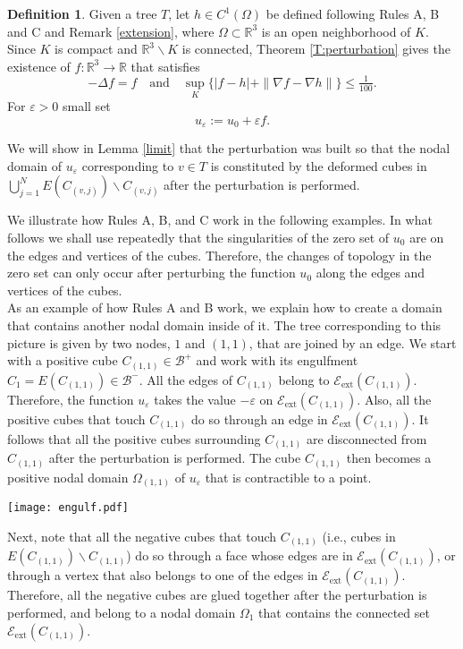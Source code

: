 \documentclass[11pt,reqno]{amsart}
\newcommand{\R}{{\mathbb R}}
\newcommand{\ep}{\varepsilon}
\theoremstyle{definition}
\newtheorem{definition}{Definition}
\begin{document}
 \begin{definition}\label{perturbation}
 Given a tree $T$,  let $h \in C^1(\Omega)$ be defined following Rules A, B and C and Remark \ref{extension}, where $\Omega \subset \R^3$ is an open neighborhood of $K$.  Since $K$ is compact and $\R^3 \backslash K$ is connected,  Theorem \ref{T:perturbation} gives the existence of  $f: \R^3 \to \R$  that satisfies 
 \[-\Delta f=f \quad \text{and} \quad  \sup_{ K}\{|f-h|+ \|\nabla f-\nabla h\|\} \leq \tfrac{1}{100}.\] 
For $\ep>0$ small set 
 \[u_\ep:= u_0 +\ep f.\]  
 \end{definition}
 We will show in Lemma \ref{limit} that the perturbation was built so that the nodal domain of $u_\ep$ corresponding to $v \in T$ is constituted by the deformed cubes in  $\bigcup_{j=1}^N E(C_{(v,j)} ) \backslash C_{(v,j)}$ after the perturbation is performed.

We illustrate how Rules A, B, and C work in the following examples.  In what follows we shall use repeatedly that the singularities of the zero set of $u_0$ are on the edges and vertices of the cubes. Therefore, the changes of topology in the zero set can only occur after perturbing the function $u_0$ along the edges and vertices of the cubes. \\

 As an example of how  Rules A and B work, we explain how to create a domain that contains another nodal domain inside of it.  The tree corresponding to this picture is given by two nodes, $1$ and $(1,1)$, that are joined by an edge. 
We start with  a positive cube $C_{(1,1)} \in \mathcal B^+$ and work with its engulfment $C_1=E(C_{(1,1)}) \in \mathcal B^-$. All the edges of $C_{(1,1)}$ belong to  $\mathcal E_{\text{ext}} (C_{(1,1)})$. Therefore, the function $u_\ep$ takes the value $-\ep$ on $\mathcal E_{\text{ext}} (C_{(1,1)})$. Also,  all the positive cubes that touch $C_{(1,1)}$ do so through an edge in $\mathcal E_{\text{ext}} (C_{(1,1)})$. It follows that all the positive cubes surrounding $C_{(1,1)}$ are disconnected from $C_{(1,1)}$  after the perturbation is performed.  The cube $C_{(1,1)}$ then becomes a positive nodal domain $\Omega_{(1,1)}$ of $u_\ep$ that is contractible to a point.

 \begin{center}
\texttt{[image: engulf.pdf]}
\end{center}
 Next, note that all the negative cubes that touch $C_{(1,1)}$  (i.e., cubes in $E(C_{(1,1)}) \backslash C_{(1,1)}$) do so through a face whose edges are in   $\mathcal E_{\text{ext}} (C_{(1,1)})$, or through a vertex that also belongs to one of the edges in  $\mathcal E_{\text{ext}} (C_{(1,1)})$. Therefore, all the negative cubes are glued together after the perturbation is performed, and belong to a nodal domain $\Omega_1$ that contains the connected set  $\mathcal E_{\text{ext}} (C_{(1,1)})$.
\end{document}

